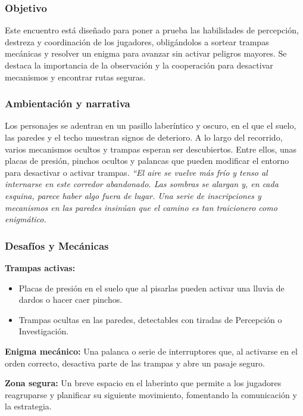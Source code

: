 \documentclass[
  twocolumn]{article}
\providecommand{\tightlist}{%
  \setlength{\itemsep}{0pt}\setlength{\parskip}{0pt}}
\begin{document}
\subsubsection{Objetivo}\label{objetivo-1}

Este encuentro está diseñado para poner a prueba las habilidades de
percepción, destreza y coordinación de los jugadores, obligándolos a
sortear trampas mecánicas y resolver un enigma para avanzar sin activar
peligros mayores. Se destaca la importancia de la observación y la
cooperación para desactivar mecanismos y encontrar rutas seguras.

\subsubsection{Ambientación y
narrativa}\label{ambientaciuxf3n-y-narrativa-1}

Los personajes se adentran en un pasillo laberíntico y oscuro, en el que
el suelo, las paredes y el techo muestran signos de deterioro. A lo
largo del recorrido, varios mecanismos ocultos y trampas esperan ser
descubiertos. Entre ellos, unas placas de presión, pinchos ocultos y
palancas que pueden modificar el entorno para desactivar o activar
trampas. \emph{``El aire se vuelve más frío y tenso al internarse en
este corredor abandonado. Las sombras se alargan y, en cada esquina,
parece haber algo fuera de lugar. Una serie de inscripciones y
mecanismos en las paredes insinúan que el camino es tan traicionero como
enigmático.}

\subsubsection{Desafíos y Mecánicas}\label{desafuxedos-y-mecuxe1nicas}

\textbf{Trampas activas:}

\begin{itemize}
\tightlist
\item
  Placas de presión en el suelo que al pisarlas pueden activar una
  lluvia de dardos o hacer caer pinchos.
\item
  Trampas ocultas en las paredes, detectables con tiradas de Percepción
  o Investigación.
\end{itemize}

\textbf{Enigma mecánico:} Una palanca o serie de interruptores que, al
activarse en el orden correcto, desactiva parte de las trampas y abre un
pasaje seguro.

\textbf{Zona segura:} Un breve espacio en el laberinto que permite a los
jugadores reagruparse y planificar su siguiente movimiento, fomentando
la comunicación y la estrategia.
\end{document}
